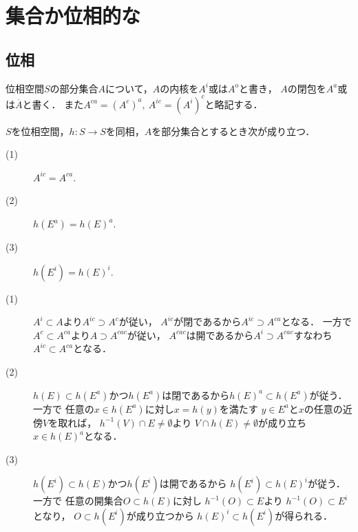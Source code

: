 \section{集合か位相的な}
\subsection{位相}
	位相空間$S$の部分集合$A$について，$A$の内核を$A^i$或は$A^{\mathrm{o}}$と書き，
	$A$の閉包を$A^a$或は$\overline{A}$と書く．
	また$A^{ca} = (A^c)^a,\ A^{ic} = (A^i)^c$と略記する．
	\begin{screen}
		\begin{thm}[閉包・内核]\label{thm:topology_note_closure_interior}
			$S$を位相空間，$h:S \longrightarrow S$を同相，$A$を部分集合とするとき次が成り立つ．
			\begin{description}
				\item[(1)] $A^{ic} = A^{ca}$.
				\item[(2)] $h(E^a) = h(E)^a$.
				\item[(3)] $h(E^i) = h(E)^i$.
			\end{description}
		\end{thm}
	\end{screen}
	
	\begin{prf}\mbox{}
		\begin{description}
			\item[(1)]
				$A^i \subset A$より$A^{ic} \supset A^c$が従い，
				$A^{ic}$が閉であるから$A^{ic} \supset A^{ca}$となる．
				一方で$A^c \subset A^{ca}$より$A \supset A^{cac}$が従い，
				$A^{cac}$は開であるから$A^i \supset A^{cac}$すなわち
				$A^{ic} \subset A^{ca}$となる．
			
			\item[(2)]
				$h(E) \subset h(E^a)$かつ$h(E^a)$は閉であるから$h(E)^a \subset h(E^a)$が従う．一方で
				任意の$x \in h(E^a)$に対し$x = h(y)$を満たす
				$y \in E^a$と$x$の任意の近傍$V$を取れば，
				$h^{-1}(V) \cap E \neq \emptyset$より
				$V \cap h(E) \neq \emptyset$が成り立ち
				$x \in h(E)^a$となる．
				
			\item[(3)]
				$h(E^i) \subset h(E)$かつ$h(E^i)$は開であるから
				$h(E^i) \subset h(E)^i$が従う．一方で
				任意の開集合$O \subset h(E)$に対し
				$h^{-1}(O) \subset E$より
				$h^{-1}(O) \subset E^i$となり，
				$O \subset h(E^i)$が成り立つから
				$h(E)^i \subset h(E^i)$が得られる．
				\QED
		\end{description}
	\end{prf}
	
